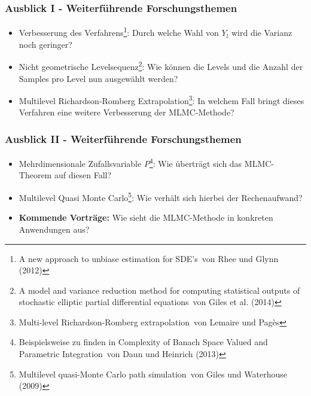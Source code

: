 \section*{}

\begin{frame}[c]
	\frametitle{Ausblick I - Weiterführende Forschungsthemen}
	\begin{itemize}
		\item Verbesserung des Verfahrens\footnote{\glqq A new approach to unbiase estimation for SDE’s\grqq\ von Rhee und Glynn (2012)}:
		\newline
		Durch welche Wahl von $Y_l$ wird die Varianz noch geringer?
		\newline
		\item Nicht geometrische Levelsequenz\footnote{\glqq A model and variance reduction method for computing statistical outputs of stochastic elliptic partial differential equations\grqq\ von Giles et al. (2014)}:
		\newline
		Wie können die Levels und die Anzahl der Samples pro Level nun ausgewählt werden?
		\newline
		\item Multilevel Richardson-Romberg Extrapolation\footnote{\glqq Multi-level Richardson-Romberg extrapolation\grqq\ von Lemaire und Pag\`{e}s}:
		\newline
		In welchem Fall bringt dieses Verfahren eine weitere Verbesserung der MLMC-Methode?
	\end{itemize}
\end{frame}

\begin{frame}[c]
	\frametitle{Ausblick II - Weiterführende Forschungsthemen}
	\begin{itemize}
		\item Mehrdimensionale Zufallsvariable $P$\footnote{Beispielsweise zu finden in \glqq Complexity of Banach Space Valued and Parametric Integration\grqq\ von Daun und Heinrich (2013)}:
		\newline
		Wie überträgt sich das MLMC-Theorem auf diesen Fall?
		\newline
		\item Multilevel Quasi Monte Carlo\footnote{\glqq Multilevel quasi-Monte Carlo path simulation\grqq\ von Giles und Waterhouse (2009)}:
		\newline
		Wie verhält sich hierbei der Rechenaufwand?
		\newline
		\newline
		\item \textbf{Kommende Vorträge:} Wie sieht die MLMC-Methode in konkreten Anwendungen aus?
	\end{itemize}
\end{frame}